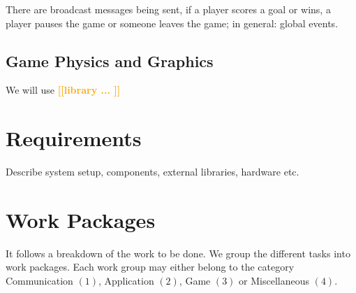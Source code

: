 \documentclass{report}
\newcommand{\todo}[1]{\textsf{\textbf{\textcolor{orange}{[[#1]]}}}}
\begin{document}
There are broadcast messages being sent, if a player scores a goal or wins, a player pauses the game or someone leaves the game; in general: global events.

\subsection{Game Physics and Graphics} We will use \todo{library ... } 


\section{Requirements}
Describe system setup, components, external libraries, hardware etc.

\section{Work Packages}
It follows a breakdown of the work to be done. We group the different tasks into work packages. Each work group may either belong to the category Communication $(1)$, Application $(2)$, Game $(3)$ or Miscellaneous $(4)$.
\end{document}
